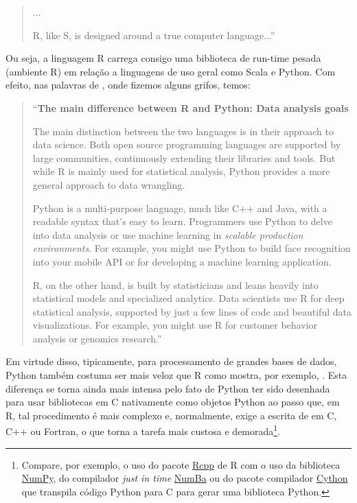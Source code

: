\documentclass[a4paper, 12pt]{report}
\begin{document}
\begin{doublespace}
\begin{quotation}
    ...
    
    R, like S, is designed around a true computer language...''
\end{quotation}

Ou seja, a linguagem R carrega consigo uma biblioteca de run-time pesada (ambiente R) em relação a linguagens de uso geral como Scala e Python.  Com efeito, nas palavras de \cite{ibmcloudteam2021}, onde fizemos alguns grifos, temos:
\begin{quotation}
   ``\textbf{The main difference between R and Python: Data analysis goals}
   
The main distinction between the two languages is in their approach to data science. Both open source programming languages are supported by large communities, continuously extending their libraries and tools. But while R is mainly used for statistical analysis, Python provides a more general approach to data wrangling.

Python is a multi-purpose language, much like C++ and Java, with a readable syntax that’s easy to learn. Programmers use Python to delve into data analysis or use machine learning in \textit{scalable production environments}. For example, you might use Python to build face recognition into your mobile API or for developing a machine learning application.

R, on the other hand, is built by statisticians and leans heavily into statistical models and specialized analytics. Data scientists use R for deep statistical analysis, supported by just a few lines of code and beautiful data visualizations. For example, you might use R for customer behavior analysis or genomics research.''
\end{quotation}

Em virtude disso, tipicamente, para processamento de grandes bases de dados, Python também costuma ser mais veloz que R como mostra, por exemplo, \cite{Korstanje2020}.  Esta diferença se torna ainda mais intensa pelo fato de Python ter sido desenhada para usar bibliotecas em C nativamente como objetos Python ao passo que, em R, tal procedimento é mais complexo e, normalmente, exige a escrita de em C, C++ ou Fortran, o que torna a tarefa mais custosa e demorada\footnote{Compare, por exemplo, o uso do pacote \href{https://cran.r-project.org/web/packages/Rcpp/index.html}{Rcpp} de R com o uso da biblioteca  \href{https://numpy.org/}{NumPy}, do compilador \textit{just in time} \href{https://numba.pydata.org/}{NumBa} ou do pacote compilador \href{https://cython.org/}{Cython} que transpila código Python para C para gerar uma biblioteca Python.}.


\end{doublespace}
\end{document}
